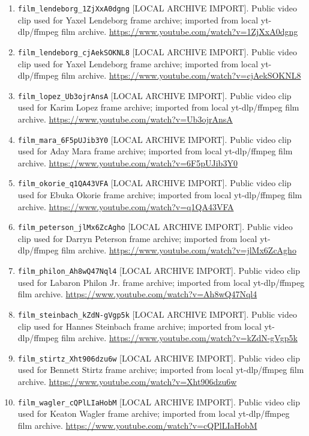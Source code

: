 \documentclass[11pt]{article}
\begin{document}
\begin{enumerate}[leftmargin=*, itemsep=2pt]
\item \texttt{film\_lendeborg\_1ZjXxA0dgng} [LOCAL ARCHIVE IMPORT]. Public video clip used for Yaxel Lendeborg frame archive; imported from local yt-dlp/ffmpeg film archive. \url{https://www.youtube.com/watch?v=1ZjXxA0dgng}
\item \texttt{film\_lendeborg\_cjAekSOKNL8} [LOCAL ARCHIVE IMPORT]. Public video clip used for Yaxel Lendeborg frame archive; imported from local yt-dlp/ffmpeg film archive. \url{https://www.youtube.com/watch?v=cjAekSOKNL8}
\item \texttt{film\_lopez\_Ub3ojrAnsA} [LOCAL ARCHIVE IMPORT]. Public video clip used for Karim Lopez frame archive; imported from local yt-dlp/ffmpeg film archive. \url{https://www.youtube.com/watch?v=Ub3ojrAnsA}
\item \texttt{film\_mara\_6F5pUJib3Y0} [LOCAL ARCHIVE IMPORT]. Public video clip used for Aday Mara frame archive; imported from local yt-dlp/ffmpeg film archive. \url{https://www.youtube.com/watch?v=6F5pUJib3Y0}
\item \texttt{film\_okorie\_q1QA43VFA} [LOCAL ARCHIVE IMPORT]. Public video clip used for Ebuka Okorie frame archive; imported from local yt-dlp/ffmpeg film archive. \url{https://www.youtube.com/watch?v=q1QA43VFA}
\item \texttt{film\_peterson\_jlMx6ZcAgho} [LOCAL ARCHIVE IMPORT]. Public video clip used for Darryn Peterson frame archive; imported from local yt-dlp/ffmpeg film archive. \url{https://www.youtube.com/watch?v=jlMx6ZcAgho}
\item \texttt{film\_philon\_Ah8wQ47Nql4} [LOCAL ARCHIVE IMPORT]. Public video clip used for Labaron Philon Jr. frame archive; imported from local yt-dlp/ffmpeg film archive. \url{https://www.youtube.com/watch?v=Ah8wQ47Nql4}
\item \texttt{film\_steinbach\_kZdN-gVgp5k} [LOCAL ARCHIVE IMPORT]. Public video clip used for Hannes Steinbach frame archive; imported from local yt-dlp/ffmpeg film archive. \url{https://www.youtube.com/watch?v=kZdN-gVgp5k}
\item \texttt{film\_stirtz\_Xht906dzu6w} [LOCAL ARCHIVE IMPORT]. Public video clip used for Bennett Stirtz frame archive; imported from local yt-dlp/ffmpeg film archive. \url{https://www.youtube.com/watch?v=Xht906dzu6w}
\item \texttt{film\_wagler\_cQPlLIaHobM} [LOCAL ARCHIVE IMPORT]. Public video clip used for Keaton Wagler frame archive; imported from local yt-dlp/ffmpeg film archive. \url{https://www.youtube.com/watch?v=cQPlLIaHobM}

\end{enumerate}
\end{document}
